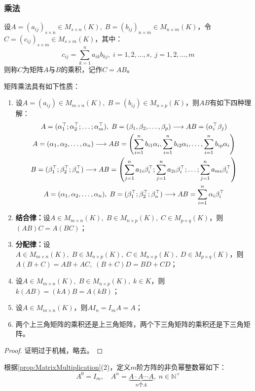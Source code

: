 \subsubsection{乘法}
\begin{definition}
	设$A=(a_{ij})_{s\times n}\in M_{s\times n}(K),\;B=(b_{ij})_{n\times m}\in M_{n\times m}(K)$，令$C=(c_{ij})_{s\times m}\in M_{s\times m}(K)$，其中：
	\begin{equation*}
		c_{ij}=\sum_{k=1}^{n}a_{ik}b_{kj},\;i=1,2,\dots,s,\;j=1,2,\dots,m
	\end{equation*}
	则称$C$为矩阵$A$与$B$的乘积，记作$C=AB$。
\end{definition}
\begin{property}\label{prop:MatrixMultiplication}
	矩阵乘法具有如下性质：
	\begin{enumerate}
		\item 设$A=(a_{ij})\in M_{m\times n}(K),\;B=(b_{ij})\in M_{n\times p}(K)$，则$AB$有如下四种理解：
		\begin{gather*}
			A=(\alpha_1^{\top};\alpha_2^{\top};\dots;\alpha_m^{\top}),\;B=(\beta_1, \beta_2, \dots, \beta_{p})\longrightarrow AB=(\alpha_i^{\top}\beta_j) \\
			A=(\alpha_1, \alpha_2, \dots, \alpha_{n})\longrightarrow AB=\left(\sum_{i=1}^{n}b_{i1}\alpha_i,\sum_{i=1}^{n}b_{i2}\alpha_i,\dots,\sum_{i=1}^{n}b_{ip}\alpha_i\right) \\
			B=(\beta_1^{\top};\beta_2^{\top};\beta_n^{\top})\longrightarrow AB=\left(\sum_{j=1}^{n}a_{1i}\beta_i^{\top};\sum_{j=1}^{n}a_{2i}\beta_i^{\top};\dots;\sum_{j=1}^{n}a_{mi}\beta_i^{\top}\right) \\
			A=(\alpha_1, \alpha_2, \dots, \alpha_{n}),\;B=(\beta_1^{\top};\beta_2^{\top};\beta_n^{\top})\longrightarrow AB=\sum_{i=1}^{n}\alpha_i\beta_i^{\top}
		\end{gather*}
		\item \textbf{结合律：}设$A\in M_{m\times n}(K),\;B\in M_{n\times p}(K),\;C\in M_{p\times q}(K)$，则$(AB)C=A(BC)$；
		\item \textbf{分配律：}设$A\in M_{m\times n}(K),\;B\in M_{n\times p}(K),\;C\in M_{n\times p}(K),\;D\in M_{p\times q}(K)$，则$A(B+C)=AB+AC,\;(B+C)D=BD+CD$；
		\item 设$A\in M_{m\times n}(K),\;B\in M_{n\times p}(K),\;k\in K$，则$k(AB)=(kA)B=A(kB)$；
		\item 设$A\in M_{m\times n}(K)$，则$AI_n=I_mA=A$；
		\item 两个上三角矩阵的乘积还是上三角矩阵，两个下三角矩阵的乘积还是下三角矩阵。
	\end{enumerate}
\end{property}
\begin{proof}
	证明过于机械，略去。
\end{proof}
\begin{definition}
	根据\cref{prop:MatrixMultiplication}(2)，定义$m$阶方阵的非负幂整数幂如下：
	\begin{equation*}
		A^0=I_m,\quad A^n=\underbrace{A\cdot A \cdots A}_{n\text{个}A},\;n\in\mathbb{N}^+
	\end{equation*}
\end{definition}
